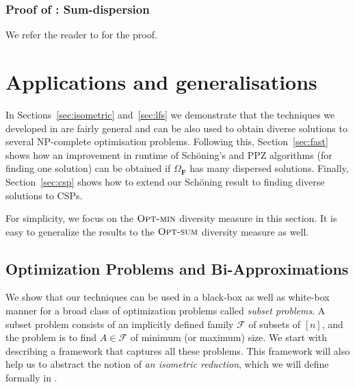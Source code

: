 \documentclass[11pt, letterpaper]{article}
\theoremstyle{definition}
\newcommand{\f}{\mathbf{F}}
\newcommand{\Om}{\Omega_{\f}}
\newcommand{\calf}{\mathcal{F}}
\newcommand{\opts}{\textsc{Opt-sum}}
\newcommand{\optm}{\textsc{Opt-min}}
\begin{document}
\subsubsection*{Proof of : Sum-dispersion} We refer the reader to  for the proof.  \section{Applications and generalisations} \label{sec:applications}

In Sections~\ref{sec:isometric} and~\ref{sec:lfs} we demonstrate that the techniques we developed in  are fairly general and can be also used to obtain diverse solutions to several NP-complete optimisation problems. Following this, Section~\ref{sec:fast} shows how an improvement in runtime of Sch\"{o}ning's and PPZ algorithms (for finding one solution) can be obtained if $\Om$ has many dispersed solutions. Finally, Section~\ref{sec:csp} shows how to extend our Sch\"{o}ning result to finding diverse solutions to CSPs.

For simplicity, we focus on the $\optm$ diversity measure in this section. It is easy to generalize the results to the $\opts$ diversity measure as well. 

\subsection*{Optimization Problems and Bi-Approximations}
\label{sec:app2}

We show that our techniques can be used in a black-box as well as white-box manner for a broad class of optimization problems called \emph{subset problems}. A subset problem consists of an implicitly defined family $\calf$ of subsets of $[n]$, and the problem is to find $A \in \calf$ of minimum (or maximum) size. We start with describing a framework that captures all these problems. This framework will also help us to abstract the notion of \emph{an isometric reduction}, which we will define formally in .
\end{document}
